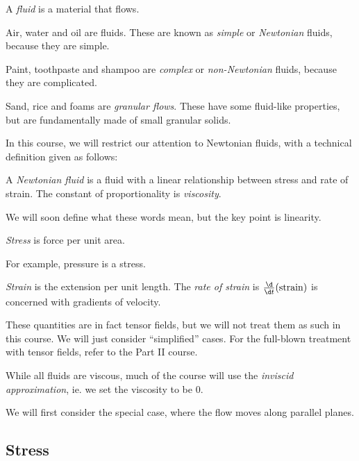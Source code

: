 \documentclass[a4paper]{article}
\begin{document}
\begin{defi}[Fluid]
  A \emph{fluid} is a material that flows.
\end{defi}

\begin{eg}
  Air, water and oil are fluids. These are known as \emph{simple} or \emph{Newtonian} fluids, because they are simple.

  Paint, toothpaste and shampoo are \emph{complex} or \emph{non-Newtonian} fluids, because they are complicated.

  Sand, rice and foams are \emph{granular flows}. These have some fluid-like properties, but are fundamentally made of small granular solids.
\end{eg}

In this course, we will restrict our attention to Newtonian fluids, with a technical definition given as follows:

\begin{defi}
  A \emph{Newtonian fluid} is a fluid with a linear relationship between stress and rate of strain. The constant of proportionality is \emph{viscosity}.
\end{defi}
We will soon define what these words mean, but the key point is linearity.

\begin{defi}[Stress]
  \emph{Stress} is force per unit area.
\end{defi}
For example, pressure is a stress.

\begin{defi}[Strain]
  \emph{Strain} is the extension per unit length. The \emph{rate of strain} is $\frac{\d}{\d t}(\mathrm{strain})$ is concerned with gradients of velocity.
\end{defi}
These quantities are in fact tensor fields, but we will not treat them as such in this course. We will just consider ``simplified'' cases. For the full-blown treatment with tensor fields, refer to the Part II course.

While all fluids are viscous, much of the course will use the \emph{inviscid approximation}, ie. we set the viscosity to be $0$.

We will first consider the special case, where the flow moves along parallel planes.

\subsection{Stress}
\end{document}
